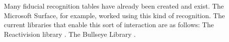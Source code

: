 Many fiducial recognition tables have already been created and exist. The Microsoft Surface, for example, worked using this kind of recognition. 
The current libraries that enable this sort of interaction are as follows:
The Reactivision library \cite{reactivision}.
The Bullseye Library \cite{bullseye}.
